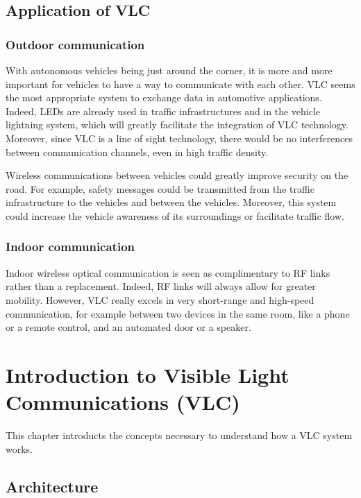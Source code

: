 \documentclass[12pt]{report}
\begin{document}
\subsection{Application of VLC}

\subsubsection{Outdoor communication}

With autonomous vehicles being just around the corner, it is more and more important for vehicles to have a way to communicate with each other. VLC seems the most appropriate system to exchange data in automotive applications.
Indeed, LEDs are already used in traffic infrastructures and in the vehicle lightning system, which will greatly facilitate the integration of VLC technology. Moreover, since VLC is a line of sight technology, there would be no interferences between communication channels, even in high traffic density.

Wireless communications between vehicles could greatly improve security on the road. For example, safety messages could be transmitted from the traffic infrastructure to the vehicles and between the vehicles. Moreover, this system could increase the vehicle awareness of its surroundings or facilitate traffic flow.

\subsubsection{Indoor communication}

Indoor wireless optical communication is seen as complimentary to RF links rather than a replacement. Indeed, RF links will always allow for greater mobility. However, VLC really excels in very short-range and high-speed communication, for example between two devices in the same room, like a phone or a remote control, and an automated door or a speaker.



\section{Introduction to Visible Light Communications (VLC)}

This chapter introducts the concepts necessary to understand how a VLC system works.

\subsection{Architecture}
\end{document}
